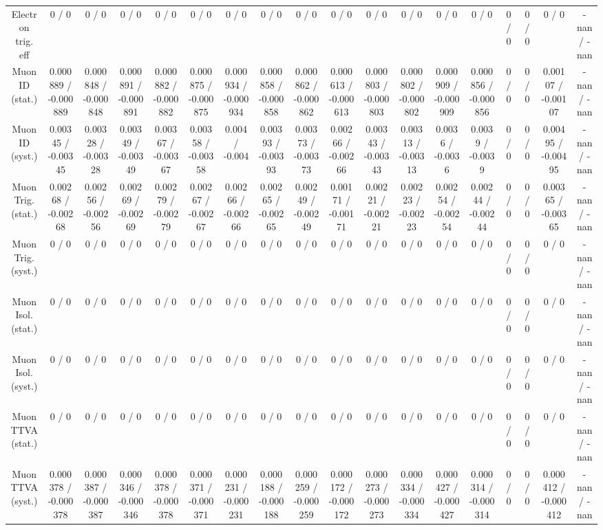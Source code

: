 \documentclass[10pt]{article}
\begin{document}
\begin{table}[htbp]
\begin{center}
\begin{tabular}{|c|c|c|c|c|c|c|c|c|c|c|c|c|c|c|c|c|c|}
  Electron trig. eff & 0 / 0 & 0 / 0 & 0 / 0 & 0 / 0 & 0 / 0 & 0 / 0 & 0 / 0 & 0 / 0 & 0 / 0 & 0 / 0 & 0 / 0 & 0 / 0 & 0 / 0 & 0 / 0 & 0 / 0 & 0 / 0 & -nan / -nan \\ 
  Muon ID (stat.) & 0.000889 / -0.000889 & 0.000848 / -0.000848 & 0.000891 / -0.000891 & 0.000882 / -0.000882 & 0.000875 / -0.000875 & 0.000934 / -0.000934 & 0.000858 / -0.000858 & 0.000862 / -0.000862 & 0.000613 / -0.000613 & 0.000803 / -0.000803 & 0.000802 / -0.000802 & 0.000909 / -0.000909 & 0.000856 / -0.000856 & 0 / 0 & 0 / 0 & 0.00107 / -0.00107 & -nan / -nan \\ 
  Muon ID (syst.) & 0.00345 / -0.00345 & 0.00328 / -0.00328 & 0.00349 / -0.00349 & 0.00367 / -0.00367 & 0.00358 / -0.00358 & 0.004 / -0.004 & 0.00393 / -0.00393 & 0.00373 / -0.00373 & 0.00266 / -0.00266 & 0.00343 / -0.00343 & 0.00313 / -0.00313 & 0.0036 / -0.0036 & 0.0039 / -0.0039 & 0 / 0 & 0 / 0 & 0.00495 / -0.00495 & -nan / -nan \\ 
  Muon Trig. (stat.) & 0.00268 / -0.00268 & 0.00256 / -0.00256 & 0.00269 / -0.00269 & 0.00279 / -0.00279 & 0.00267 / -0.00267 & 0.00266 / -0.00266 & 0.00265 / -0.00265 & 0.00249 / -0.00249 & 0.00171 / -0.00171 & 0.00221 / -0.00221 & 0.00223 / -0.00223 & 0.00254 / -0.00254 & 0.00244 / -0.00244 & 0 / 0 & 0 / 0 & 0.00365 / -0.00365 & -nan / -nan \\ 
  Muon Trig. (syst.) & 0 / 0 & 0 / 0 & 0 / 0 & 0 / 0 & 0 / 0 & 0 / 0 & 0 / 0 & 0 / 0 & 0 / 0 & 0 / 0 & 0 / 0 & 0 / 0 & 0 / 0 & 0 / 0 & 0 / 0 & 0 / 0 & -nan / -nan \\ 
  Muon Isol. (stat.) & 0 / 0 & 0 / 0 & 0 / 0 & 0 / 0 & 0 / 0 & 0 / 0 & 0 / 0 & 0 / 0 & 0 / 0 & 0 / 0 & 0 / 0 & 0 / 0 & 0 / 0 & 0 / 0 & 0 / 0 & 0 / 0 & -nan / -nan \\ 
  Muon Isol. (syst.) & 0 / 0 & 0 / 0 & 0 / 0 & 0 / 0 & 0 / 0 & 0 / 0 & 0 / 0 & 0 / 0 & 0 / 0 & 0 / 0 & 0 / 0 & 0 / 0 & 0 / 0 & 0 / 0 & 0 / 0 & 0 / 0 & -nan / -nan \\ 
  Muon TTVA (stat.) & 0 / 0 & 0 / 0 & 0 / 0 & 0 / 0 & 0 / 0 & 0 / 0 & 0 / 0 & 0 / 0 & 0 / 0 & 0 / 0 & 0 / 0 & 0 / 0 & 0 / 0 & 0 / 0 & 0 / 0 & 0 / 0 & -nan / -nan \\ 
  Muon TTVA (syst.) & 0.000378 / -0.000378 & 0.000387 / -0.000387 & 0.000346 / -0.000346 & 0.000378 / -0.000378 & 0.000371 / -0.000371 & 0.000231 / -0.000231 & 0.000188 / -0.000188 & 0.000259 / -0.000259 & 0.000172 / -0.000172 & 0.000273 / -0.000273 & 0.000334 / -0.000334 & 0.000427 / -0.000427 & 0.000314 / -0.000314 & 0 / 0 & 0 / 0 & 0.000412 / -0.000412 & -nan / -nan \\ 

\end{tabular}
\end{center}
\end{table}
\end{document}
